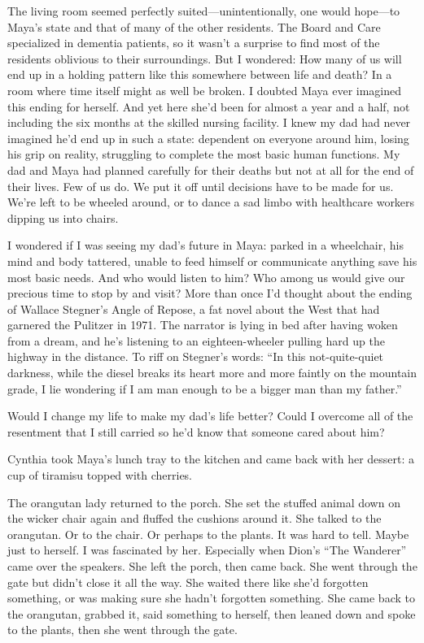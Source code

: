 \documentclass[12pt]{book}
\begin{document}
The living room seemed perfectly suited---unintentionally, one would hope---to Maya's state and that of many of the other residents. The Board and Care specialized in dementia patients, so it wasn't a surprise to find most of the residents oblivious to their surroundings. But I wondered: How many of us will end up in a holding pattern like this somewhere between life and death? In a room where time itself might as well be broken. I doubted Maya ever imagined this ending for herself. And yet here she'd been for almost a year and a half, not including the six months at the skilled nursing facility. I knew my dad had never imagined he'd end up in such a state: dependent on everyone around him, losing his grip on reality, struggling to complete the most basic human functions. My dad and Maya had planned carefully for their deaths but not at all for the end of their lives. Few of us do. We put it off until decisions have to be made for us. We're left to be wheeled around, or to dance a sad limbo with healthcare workers dipping us into chairs.

I wondered if I was seeing my dad's future in Maya: parked in a wheelchair, his mind and body tattered, unable to feed himself or communicate anything save his most basic needs. And who would listen to him? Who among us would give our precious time to stop by and visit? More than once I'd thought about the ending of Wallace Stegner's Angle of Repose, a fat novel about the West that had garnered the Pulitzer in 1971. The narrator is lying in bed after having woken from a dream, and he's listening to an eighteen-wheeler pulling hard up the highway in the distance. To riff on Stegner's words: ``In this not-quite-quiet darkness, while the diesel breaks its heart more and more faintly on the mountain grade, I lie wondering if I am man enough to be a bigger man than my father.''

Would I change my life to make my dad's life better? Could I overcome all of the resentment that I still carried so he'd know that someone cared about him?

Cynthia took Maya's lunch tray to the kitchen and came back with her dessert: a cup of tiramisu topped with cherries.

The orangutan lady returned to the porch. She set the stuffed animal down on the wicker chair again and fluffed the cushions around it. She talked to the orangutan. Or to the chair. Or perhaps to the plants. It was hard to tell. Maybe just to herself. I was fascinated by her. Especially when Dion's ``The Wanderer'' came over the speakers. She left the porch, then came back. She went through the gate but didn't close it all the way. She waited there like she'd forgotten something, or was making sure she hadn't forgotten something. She came back to the orangutan, grabbed it, said something to herself, then leaned down and spoke to the plants, then she went through the gate.
\end{document}
